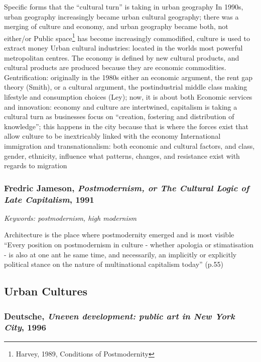 \documentclass{article}
\begin{document}
\begin{outline}
	\1 Specific forms that the ``cultural turn'' is taking in urban geography
		\2 In 1990s, urban geography increasingly became urban cultural geography; there was a merging of culture and economy, and urban geography became both, not either/or
		\2 Public space\footnote{Harvey, 1989, Conditions of Postmodernity} has become increasingly commodified, culture is used to extract money
		\2 Urban cultural industries: located in the worlds most powerful metropolitan centres. The economy is defined by new cultural products, and cultural products are produced because they are economic commodities.
		\2 Gentrification: originally in the 1980s either an economic argument, the rent gap theory (Smith), or a cultural argument, the postindustrial middle class making lifestyle and consumption choices (Ley); now, it is about both
		\2 Economic services and innovation: economy and culture are intertwined, capitalism is taking a cultural turn as businesses focus on ``creation, fostering and distribution of knowledge''; this happens in the city because that is where the forces exist that allow culture to be inextricably linked with the economy
		\2 International immigration and transnationalism: both economic and cultural factors, and class, gender, ethnicity, influence what patterns, changes, and resistance exist with regards to migration
\end{outline}

\subsubsection{Fredric Jameson, \textit{Postmodernism, or The Cultural Logic of Late Capitalism}, 1991}

\textit{Keywords: postmodernism, high modernism}

\begin{outline}
	\1 Architecture is the place where postmodernity emerged and is most visible
	\1 ``Every position on postmodernism in culture - whether apologia or stimatisation - is also at one ant he same time, and necessarily, an implicitly or explicitly political stance on the nature of multinational capitalism today'' (p.55)
	\1
\end{outline}

\subsection{Urban Cultures}

\subsubsection{Deutsche, \textit{Uneven development: public art in New York City}, 1996}
\end{document}
